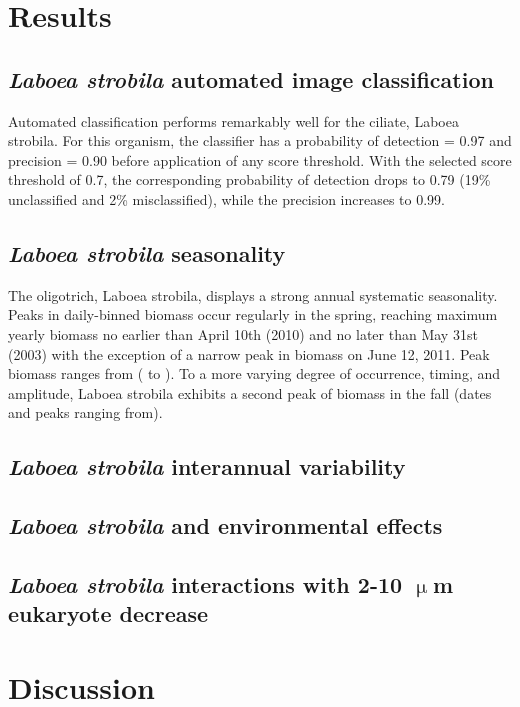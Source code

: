 \section{Results}

\subsection{\textit{Laboea strobila} automated image classification}

Automated classification performs remarkably well for the ciliate, {Laboea strobila}. For this organism, the classifier has a probability of detection = 0.97 and precision = 0.90 before application of any score threshold. With the selected score threshold of 0.7, the corresponding probability of detection drops to 0.79 (19\% unclassified and 2\% misclassified), while the precision increases to 0.99.

\subsection{\textit{Laboea strobila} seasonality}

The oligotrich, Laboea strobila, displays a strong annual systematic seasonality. Peaks in daily-binned biomass occur regularly in the spring, reaching maximum yearly biomass no earlier than April 10th (2010) and no later than May 31st (2003) with the exception of a narrow peak in biomass on June 12, 2011. Peak biomass ranges from (  to  ). To a more varying degree of occurrence, timing, and amplitude, Laboea strobila exhibits a second peak of biomass in the fall (dates and peaks ranging from). 

\subsection{\textit{Laboea strobila} interannual variability}

\subsection{\textit{Laboea strobila} and environmental effects}

\subsection{\textit{Laboea strobila} interactions with 2-10 $\upmu$m eukaryote decrease}



\section{Discussion}

